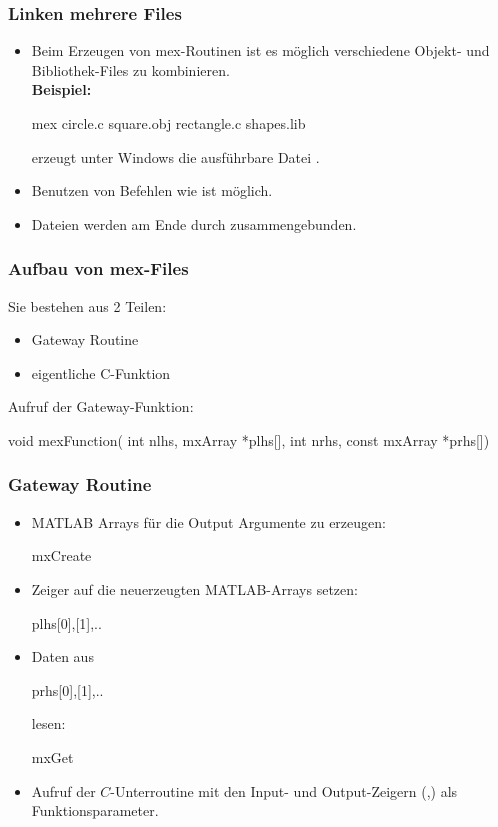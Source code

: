 \documentclass[hyperref={xetex}]{beamer}
\begin{document}
%
\begin{frame}[fragile]\frametitle{Linken mehrere Files}
\begin{itemize}
\item Beim Erzeugen von mex-Routinen ist es m\"oglich verschiedene Objekt- und
Bibliothek-Files zu kombinieren. \\
\textbf{Beispiel:}
\begin{matlabin}
mex circle.c square.obj rectangle.c 
    shapes.lib
\end{matlabin}
erzeugt unter Windows die ausf\"uhrbare Datei . \\

\item Benutzen von Befehlen wie 
ist m\"oglich. 

\item Dateien werden am Ende durch  zusammengebunden. 
\end{itemize}
\end{frame}
%
%
\begin{frame}[fragile]\frametitle{Aufbau von mex-Files}
Sie bestehen aus 2 Teilen:
\begin{itemize}
 \item  Gateway Routine
\item eigentliche C-Funktion
\end{itemize}
Aufruf der Gateway-Funktion:
\begin{matlabin}[language=C++]
void mexFunction(
   int nlhs, mxArray *plhs[],
   int nrhs, const mxArray *prhs[])
\end{matlabin}

\end{frame}
%
%
\begin{frame}[fragile]\frametitle{Gateway Routine}

\begin{itemize}
\item MATLAB Arrays f\"ur die Output Argumente zu erzeugen:
\begin{matlabin}[language=C++]
mxCreate
\end{matlabin}
\item Zeiger auf die neuerzeugten MATLAB-Arrays setzen:
\begin{matlabin}[language=C++]
plhs[0],[1],..
\end{matlabin}
\item Daten aus 
\begin{matlabin}[language=C++]
prhs[0],[1],.. 
\end{matlabin}
lesen:
\begin{matlabin}[language=C++]
mxGet
\end{matlabin}
\item Aufruf der $C$-Unterroutine mit den Input- und Output-Zeigern (,) als
  Funktionsparameter. 
\end{itemize}
\end{frame}
\end{document}
